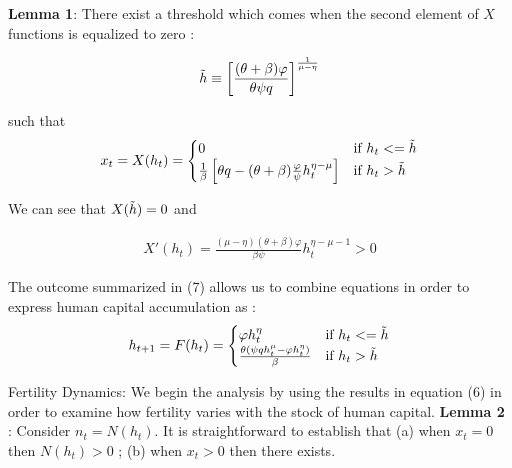 \textbf{Lemma 1}: There exist a threshold which comes when the second element of $X$ functions is equalized to zero : 

    \begin{equation}
    \begin{aligned}
    \Tilde{h} \equiv \left[\frac{(\theta + \beta)\varphi}{\theta \psi q}\right]^{\frac{1}{\mu - \eta}}
    \end{aligned}
    \end{equation}

such that 
    \begin{equation}
    \begin{aligned}
    x_t = X(h_t)  = \begin{cases}
                    0 & \text{if } h_t <= \Tilde{h} \\
                     \frac{1}{\beta}\left[\theta q - (\theta + \beta) \frac{\varphi}{\psi}  h_t^{\eta - \mu}\right] & \text{if } h_t > \Tilde{h}
                     \end{cases}
    \end{aligned}
    \end{equation}

We can see that $ X(\Tilde{h}) = 0$ and 

    \begin{equation}
    \begin{aligned}
    X'(h_t) = \frac{(\mu - \eta)(\theta + \beta)\varphi}{\beta\psi}h_{t}^{\eta - \mu-1} > 0
    \end{aligned}
    \end{equation}

The outcome summarized in (7) allows us to combine equations in order to express human capital accumulation as : 
    \begin{equation}
    \begin{aligned}
    h_{t+1} = F(h_t)  = \begin{cases}
                    \varphi h_{t}^{\eta}  & \text{if } h_t <= \Tilde{h} \\
                     \frac{\theta (\psi q h_{t}^{\mu} - \varphi h_{t}^{\eta})}{\beta}  & \text{if } h_t > \Tilde{h}
                     \end{cases}
    \end{aligned}
    \end{equation}

Fertility Dynamics:
We begin the analysis by using the results in equation (6) in order to examine how fertility varies with the stock of human capital.
\textbf{Lemma 2} :
Consider $n_t = N(h_t)$. It is straightforward to establish that (a) when $x_t = 0$ then $N(h_t)>0$ ; (b) when $x_t > 0$ then there exists. 
   
